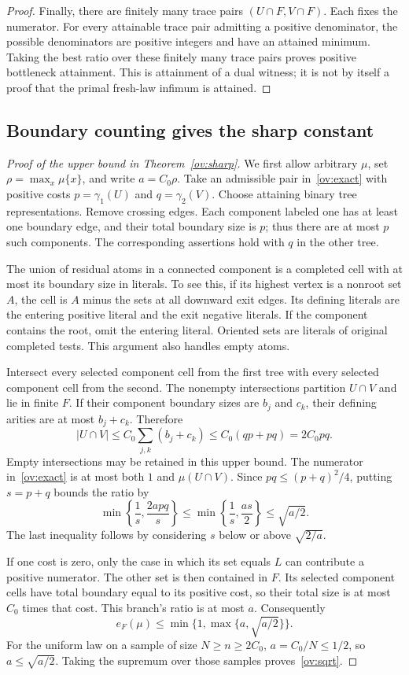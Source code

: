 \begin{proof}
Finally, there are finitely many trace pairs $(U\cap F,V\cap F)$. Each fixes the numerator. For every attainable trace pair admitting a positive denominator, the possible denominators are positive integers and have an attained minimum. Taking the best ratio over these finitely many trace pairs proves positive bottleneck attainment. This is attainment of a dual witness; it is not by itself a proof that the primal fresh-law infimum is attained.
\end{proof}

\subsection{Boundary counting gives the sharp constant}
\begin{proof}[Proof of the upper bound in Theorem~\ref{ov:sharp}]
We first allow arbitrary $\mu$, set $\rho=\max_x\mu\{x\}$, and write $a=C_0\rho$. Take an admissible pair in~\eqref{ov:exact} with positive costs $p=\gamma_1(U)$ and $q=\gamma_2(V)$. Choose attaining binary tree representations. Remove crossing edges. Each component labeled one has at least one boundary edge, and their total boundary size is $p$; thus there are at most $p$ such components. The corresponding assertions hold with $q$ in the other tree.

The union of residual atoms in a connected component is a completed cell with at most its boundary size in literals. To see this, if its highest vertex is a nonroot set $A$, the cell is $A$ minus the sets at all downward exit edges. Its defining literals are the entering positive literal and the exit negative literals. If the component contains the root, omit the entering literal. Oriented sets are literals of original completed tests. This argument also handles empty atoms.

Intersect every selected component cell from the first tree with every selected component cell from the second. The nonempty intersections partition $U\cap V$ and lie in finite $F$. If their component boundary sizes are $b_j$ and $c_k$, their defining arities are at most $b_j+c_k$. Therefore
\[
 |U\cap V|\le C_0\sum_{j,k}(b_j+c_k)
 \le C_0(qp+pq)=2C_0pq.
\]
Empty intersections may be retained in this upper bound. The numerator in~\eqref{ov:exact} is at most both $1$ and $\mu(U\cap V)$. Since $pq\le(p+q)^2/4$, putting $s=p+q$ bounds the ratio by
\[
 \min\left\{\frac1s,\frac{2apq}{s}\right\}
 \le\min\left\{\frac1s,\frac{as}{2}\right\}
 \le\sqrt{a/2}.
\]
The last inequality follows by considering $s$ below or above $\sqrt{2/a}$.

If one cost is zero, only the case in which its set equals $L$ can contribute a positive numerator. The other set is then contained in $F$. Its selected component cells have total boundary equal to its positive cost, so their total size is at most $C_0$ times that cost. This branch's ratio is at most $a$. Consequently
\[
 e_F(\mu)\le\min\{1,\max\{a,\sqrt{a/2}\}\}.
\]
For the uniform law on a sample of size $N\ge n\ge2C_0$, $a=C_0/N\le1/2$, so $a\le\sqrt{a/2}$. Taking the supremum over those samples proves~\eqref{ov:sqrt}.
\end{proof}


